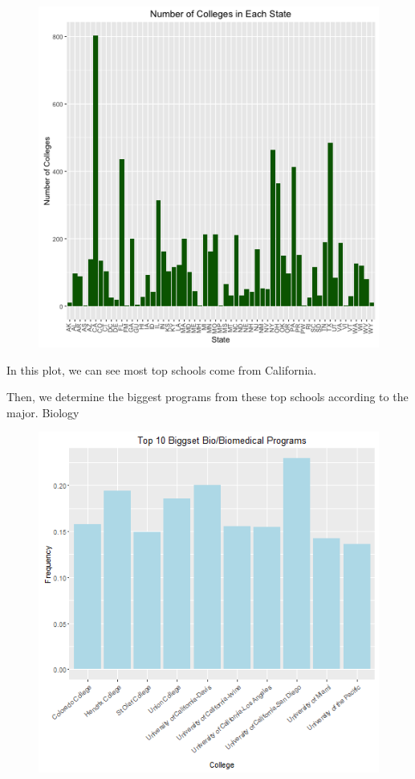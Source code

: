 \documentclass{article}
\begin{document}
\begin{figure}[h!]
\includegraphics{../images/college-frequency.png}
\end{figure}
In this plot, we can see most top schools come from California. 


Then, we determine the biggest programs from these top schools according to the major. 
Biology 
\begin{figure}[h!]
\includegraphics{../images/biggestBio.png}
\end{figure}
\end{document}
